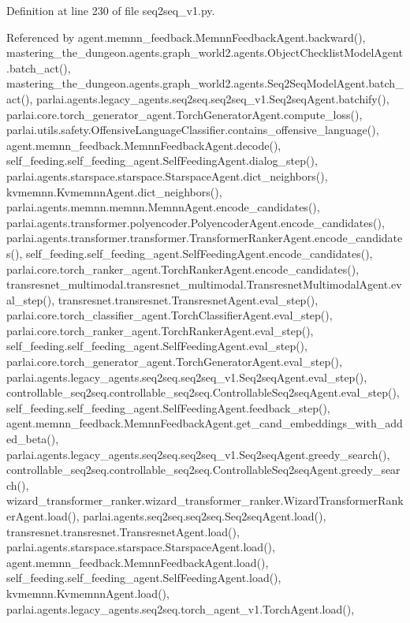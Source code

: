 Definition at line 230 of file seq2seq\+\_\+v1.\+py.



Referenced by agent.\+memnn\+\_\+feedback.\+Memnn\+Feedback\+Agent.\+backward(), mastering\+\_\+the\+\_\+dungeon.\+agents.\+graph\+\_\+world2.\+agents.\+Object\+Checklist\+Model\+Agent.\+batch\+\_\+act(), mastering\+\_\+the\+\_\+dungeon.\+agents.\+graph\+\_\+world2.\+agents.\+Seq2\+Seq\+Model\+Agent.\+batch\+\_\+act(), parlai.\+agents.\+legacy\+\_\+agents.\+seq2seq.\+seq2seq\+\_\+v1.\+Seq2seq\+Agent.\+batchify(), parlai.\+core.\+torch\+\_\+generator\+\_\+agent.\+Torch\+Generator\+Agent.\+compute\+\_\+loss(), parlai.\+utils.\+safety.\+Offensive\+Language\+Classifier.\+contains\+\_\+offensive\+\_\+language(), agent.\+memnn\+\_\+feedback.\+Memnn\+Feedback\+Agent.\+decode(), self\+\_\+feeding.\+self\+\_\+feeding\+\_\+agent.\+Self\+Feeding\+Agent.\+dialog\+\_\+step(), parlai.\+agents.\+starspace.\+starspace.\+Starspace\+Agent.\+dict\+\_\+neighbors(), kvmemnn.\+Kvmemnn\+Agent.\+dict\+\_\+neighbors(), parlai.\+agents.\+memnn.\+memnn.\+Memnn\+Agent.\+encode\+\_\+candidates(), parlai.\+agents.\+transformer.\+polyencoder.\+Polyencoder\+Agent.\+encode\+\_\+candidates(), parlai.\+agents.\+transformer.\+transformer.\+Transformer\+Ranker\+Agent.\+encode\+\_\+candidates(), self\+\_\+feeding.\+self\+\_\+feeding\+\_\+agent.\+Self\+Feeding\+Agent.\+encode\+\_\+candidates(), parlai.\+core.\+torch\+\_\+ranker\+\_\+agent.\+Torch\+Ranker\+Agent.\+encode\+\_\+candidates(), transresnet\+\_\+multimodal.\+transresnet\+\_\+multimodal.\+Transresnet\+Multimodal\+Agent.\+eval\+\_\+step(), transresnet.\+transresnet.\+Transresnet\+Agent.\+eval\+\_\+step(), parlai.\+core.\+torch\+\_\+classifier\+\_\+agent.\+Torch\+Classifier\+Agent.\+eval\+\_\+step(), parlai.\+core.\+torch\+\_\+ranker\+\_\+agent.\+Torch\+Ranker\+Agent.\+eval\+\_\+step(), self\+\_\+feeding.\+self\+\_\+feeding\+\_\+agent.\+Self\+Feeding\+Agent.\+eval\+\_\+step(), parlai.\+core.\+torch\+\_\+generator\+\_\+agent.\+Torch\+Generator\+Agent.\+eval\+\_\+step(), parlai.\+agents.\+legacy\+\_\+agents.\+seq2seq.\+seq2seq\+\_\+v1.\+Seq2seq\+Agent.\+eval\+\_\+step(), controllable\+\_\+seq2seq.\+controllable\+\_\+seq2seq.\+Controllable\+Seq2seq\+Agent.\+eval\+\_\+step(), self\+\_\+feeding.\+self\+\_\+feeding\+\_\+agent.\+Self\+Feeding\+Agent.\+feedback\+\_\+step(), agent.\+memnn\+\_\+feedback.\+Memnn\+Feedback\+Agent.\+get\+\_\+cand\+\_\+embeddings\+\_\+with\+\_\+added\+\_\+beta(), parlai.\+agents.\+legacy\+\_\+agents.\+seq2seq.\+seq2seq\+\_\+v1.\+Seq2seq\+Agent.\+greedy\+\_\+search(), controllable\+\_\+seq2seq.\+controllable\+\_\+seq2seq.\+Controllable\+Seq2seq\+Agent.\+greedy\+\_\+search(), wizard\+\_\+transformer\+\_\+ranker.\+wizard\+\_\+transformer\+\_\+ranker.\+Wizard\+Transformer\+Ranker\+Agent.\+load(), parlai.\+agents.\+seq2seq.\+seq2seq.\+Seq2seq\+Agent.\+load(), transresnet.\+transresnet.\+Transresnet\+Agent.\+load(), parlai.\+agents.\+starspace.\+starspace.\+Starspace\+Agent.\+load(), agent.\+memnn\+\_\+feedback.\+Memnn\+Feedback\+Agent.\+load(), self\+\_\+feeding.\+self\+\_\+feeding\+\_\+agent.\+Self\+Feeding\+Agent.\+load(), kvmemnn.\+Kvmemnn\+Agent.\+load(), parlai.\+agents.\+legacy\+\_\+agents.\+seq2seq.\+torch\+\_\+agent\+\_\+v1.\+Torch\+Agent.\+load(), 